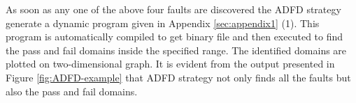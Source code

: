 \documentclass[runningheads,a4paper]{llncs}
\begin{document}
As soon as any one of the above four faults are discovered the ADFD strategy generate a dynamic program given in Appendix \ref{sec:appendix1} (1). This program is automatically compiled to get binary file and then executed to find the pass and fail domains inside the specified range. The identified domains are plotted on two-dimensional graph. It is evident from the output presented in Figure \ref{fig:ADFD-example} that ADFD strategy not only finds all the faults but also the pass and fail domains.

\end{document}
